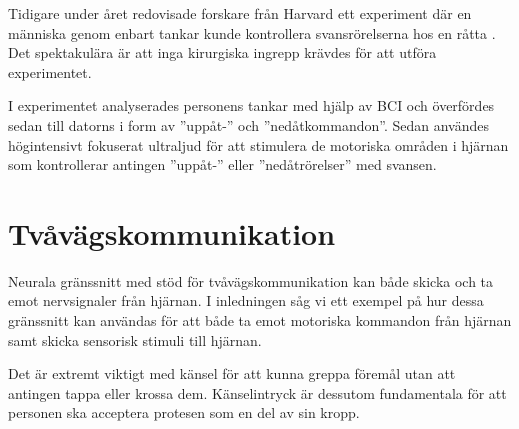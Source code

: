 \documentclass[12pt, a4paper]{article}
\begin{document}
Tidigare under året redovisade forskare från Harvard ett experiment där en
människa genom enbart tankar kunde kontrollera svansrörelserna hos en råtta
\cite{bbi}. Det spektakulära är att inga kirurgiska ingrepp krävdes för att
utföra experimentet.

I experimentet analyserades personens tankar med hjälp av BCI och överfördes
sedan till datorns i form av ''uppåt-'' och ''nedåtkommandon''. Sedan användes
högintensivt fokuserat ultraljud för att stimulera de motoriska områden i
hjärnan som kontrollerar antingen ''uppåt-'' eller ''nedåtrörelser'' med
svansen.



\section{Tvåvägskommunikation}

Neurala gränssnitt med stöd för tvåvägskommunikation kan både skicka och ta emot
nervsignaler från hjärnan. I inledningen såg vi ett exempel på hur dessa
gränssnitt kan användas för att både ta emot motoriska kommandon från hjärnan
samt skicka sensorisk stimuli till hjärnan.


Det är extremt viktigt med känsel för att kunna greppa föremål utan att antingen
tappa eller krossa dem. Känselintryck är dessutom fundamentala för att personen
ska acceptera protesen som en del av sin kropp. \cite{prosthetic_operation}


%
%
%
%
%
%
%
\end{document}
